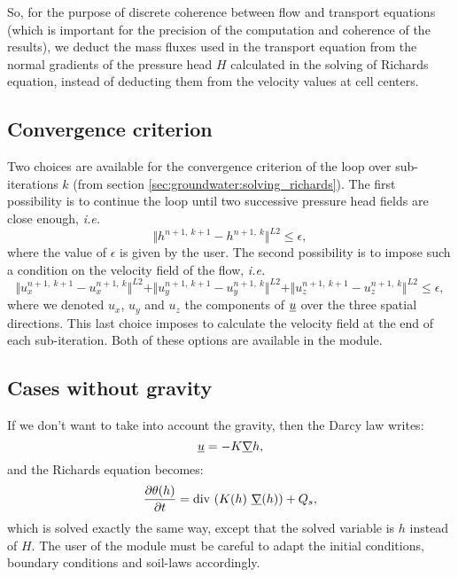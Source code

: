 So, for the purpose of discrete coherence between flow and transport equations (which is important for the precision of the computation and coherence of the results), we deduct the mass fluxes
used in the transport equation from the normal gradients of the pressure head $H$ calculated in the solving of
Richards equation, instead of deducting them from the velocity values at cell centers.

\subsection{Convergence criterion}
Two choices are available for the convergence criterion of the loop over sub-iterations $k$ (from section \ref{sec:groundwater:solving_richards}).
The first possibility is to continue the loop until two successive pressure head fields are close enough, \emph{i.e.}
$$\Vert h^{n + 1, \ k + 1} - h^{n + 1, \ k } \Vert^{L2} \leq \epsilon,$$
where the value of $\epsilon$ is given by the user.
The second possibility is to impose such a condition on the velocity field of the flow, \emph{i.e.}
$$\Vert u_x^{n + 1, \ k + 1} - u_x^{n + 1, \ k } \Vert^{L2}
+ \Vert u_y^{n + 1, \ k + 1} - u_y^{n + 1, \ k } \Vert^{L2}
+ \Vert u_z^{n + 1, \ k + 1} - u_z^{n + 1, \ k } \Vert^{L2} \leq \epsilon,$$
where we denoted $u_x$, $u_y$ and $u_z$ the components of $\underline{u}$ over the three spatial directions.
This last choice imposes to calculate the velocity field at the end of each sub-iteration.
Both of these options are available in the module.

\subsection{Cases without gravity}
If we don't want to take into account the gravity, then the Darcy law writes:
\begin{equation}
\label{eq:groundwater:darcy_without_gravity}
 \underline{u} = - K \underline{\nabla} h,
\end{equation}
and the Richards equation becomes:
\begin{equation}
 \frac{\partial{\theta(h)}}{\partial{t}} = \text{div}\, \left( K(h) \ \underline{\nabla}(h) \right) + Q_s,
\end{equation}
which is solved exactly the same way, except that the solved variable is $h$ instead of $H$. The user of the module
must be careful to adapt the initial conditions, boundary conditions and soil-laws accordingly.

